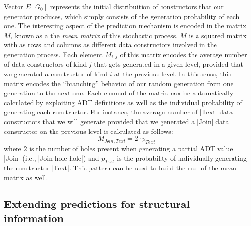 Vector $E[G_0]$ represents the initial distribuition of constructors that our
generator produces, which simply consists of the generation probability of each
one.
%
The interesting aspect of the prediction mechanism is encoded in the matrix $M$,
known as a the \emph{mean matrix} of this stochastic process.
%
$M$ is a squared matrix with as rows and columns as different data constructors
involved in the generation process.
%
Each element $M_{i,j}$ of this matrix encodes the average number of data
constructors of kind $j$ that gets generated in a given level, provided that we
generated a constructor of kind $i$ at the previous level.
%
In this sense, this matrix encodes the ``branching'' behavior of our random
generation from one generation to the next one.
%
Each element of the matrix can be automatically calculated by exploiting ADT
definitions \cite{DBLP:conf/haskell/MistaRH18}
%
%
as well as the individual probability of generating each constructor.
%
For instance, the average number of |Text| data constructors that we will
generate provided that we generated a |Join| data constructor on the previous
level is calculated as follows:
%
$$ M_{Join, Text} = 2\cdot p_{Text} $$
%
where $2$ is the number of holes present when generating a partial ADT value
|Join| (i.e., |Join hole hole|) and $p_{Text}$ is the probability of
individually generating the constructor |Text|.
%
This pattern can be used to build the rest of the mean matrix as well.



\subsection{Extending predictions for structural information}

